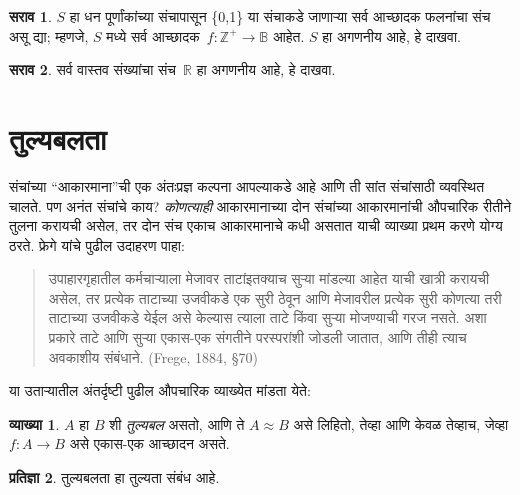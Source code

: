 \documentclass[11pt,a4paper,openany]{book}
\theoremstyle{definition}
\newtheorem{defn}{व्याख्या}[section]
\newtheorem{prop}[defn]{प्रतिज्ञा}
\newtheorem{prob}{सराव}[chapter]
\newcommand{\Real}{\mathbb{R}}
\newcommand{\PosInt}{\mathbb{Z}^{+}}
\newcommand{\Bin}{\mathbb{B}}
\newcommand{\cardeq}[2]{#1 \approx #2}
\begin{document}
\begin{prob}
$S$ हा धन पूर्णांकांच्या संचापासून \{0,1\} या संचाकडे जाणाऱ्या सर्व
आच्छादक फलनांचा संच असू द्या; म्हणजे, $S$ मध्ये सर्व
आच्छादक~$f\colon \PosInt \to \Bin$ आहेत. $S$ हा
अगणनीय आहे, हे दाखवा.
\end{prob}

\begin{prob}
सर्व वास्तव संख्यांचा संच~$\Real$ हा अगणनीय आहे, हे दाखवा.
\end{prob}









\section{तुल्यबलता}\label{sfr:siz:equ:sec}

संचांच्या ``आकारमाना''ची एक अंतःप्रज्ञ कल्पना आपल्याकडे आहे आणि ती
सांत संचांसाठी व्यवस्थित चालते. पण अनंत संचांचे काय? \emph{कोणत्याही}
आकारमानाच्या दोन संचांच्या आकारमानांची औपचारिक रीतीने तुलना करायची
असेल, तर दोन संच एकाच आकारमानाचे कधी असतात याची व्याख्या प्रथम करणे
योग्य ठरते. फ्रेगे यांचे पुढील उदाहरण पाहा:
\begin{quote}
  उपाहारगृहातील कर्मचाऱ्याला मेजावर ताटांइतक्याच सुऱ्या मांडल्या आहेत
  याची खात्री करायची असेल, तर प्रत्येक ताटाच्या उजवीकडे एक सुरी ठेवून
  आणि मेजावरील प्रत्येक सुरी कोणत्या तरी ताटाच्या उजवीकडे येईल असे
  केल्यास त्याला ताटे किंवा सुऱ्या मोजण्याची गरज नसते. अशा प्रकारे
  ताटे आणि सुऱ्या एकास-एक संगतीने परस्परांशी जोडली जातात, आणि तीही
  त्याच अवकाशीय संबंधाने. (Frege, 1884, \S70)
\end{quote}
या उताऱ्यातील अंतर्दृष्टी पुढील औपचारिक व्याख्येत मांडता येते:

\begin{defn}\label{sfr:siz:equ:comparisondef}
  $A$ हा $B$ शी \emph{तुल्यबल} असतो, आणि ते $\cardeq{A}{B}$ असे लिहितो,
  तेव्हा आणि केवळ तेव्हाच, जेव्हा $f \colon A \to B$ असे
  एकास-एक आच्छादन असते.
\end{defn}

\begin{prop}\label{sfr:siz:equ:equinumerosityisequi}
तुल्यबलता हा तुल्यता संबंध आहे.
\end{prop}
\end{document}
